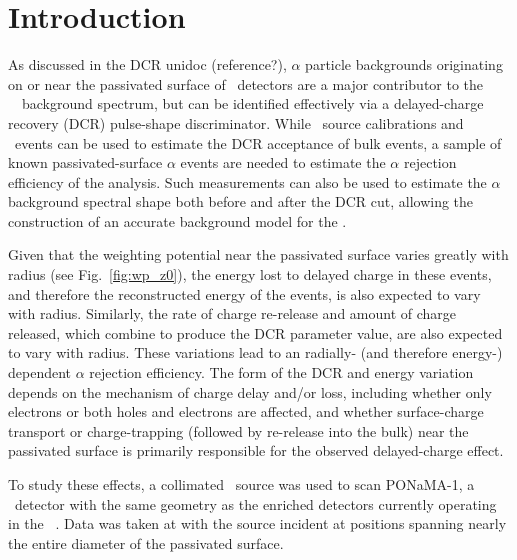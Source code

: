 \documentclass[groupedaddress,rmp,amsmath,amssymb,bibnotes,altaffilletter,twocolumn]{revtex4-1}
\begin{document}
\pagestyle{uniheader}

\date{\today}
\maketitle
\thispagestyle{uniheader}
\tableofcontents

\section{Introduction}
As discussed in the DCR unidoc (reference?), $\alpha$ particle backgrounds originating on or near the passivated surface of \ppc\ detectors are a major contributor to the \MJ\ \DEM\ background spectrum, but can be identified effectively via a delayed-charge recovery (DCR) pulse-shape discriminator. While \thtte\ source calibrations and \twonubb\ events can be used to estimate the DCR acceptance of bulk events, a sample of known passivated-surface $\alpha$ events are needed to estimate the $\alpha$ rejection efficiency of the analysis. Such measurements can also be used to estimate the $\alpha$ background spectral shape both before and after the DCR cut, allowing the construction of an accurate background model for the \DEM. 

Given that the weighting potential near the passivated surface varies greatly with radius (see Fig.~\ref{fig:wp_z0}), the energy lost to delayed charge in these events, and therefore the reconstructed energy of the events, is also expected to vary with radius. Similarly, the rate of charge re-release and amount of charge released, which combine to produce the DCR parameter value, are also expected to vary with radius. These variations lead to an radially- (and therefore energy-) dependent $\alpha$ rejection efficiency. The form of the DCR and energy variation depends on the mechanism of charge delay and/or loss, including whether only electrons or both holes and electrons are affected, and whether surface-charge transport or charge-trapping (followed by re-release into the bulk) near the passivated surface is primarily responsible for the observed delayed-charge effect. 

To study these effects, a collimated \am\ source was used to scan PONaMA-1, a \ppc\ detector with the same geometry as the enriched detectors currently operating in the \MJ\ \DEM. Data was taken at with the source incident at positions spanning nearly the entire diameter of the passivated surface. 
\end{document}

